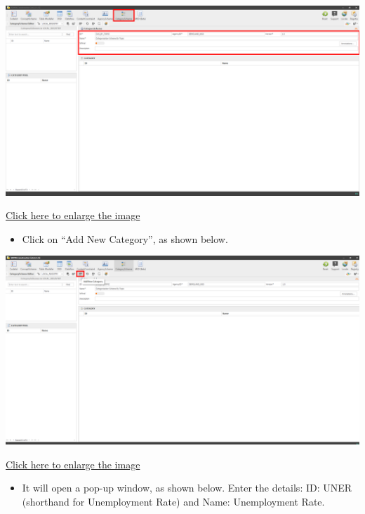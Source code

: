 \documentclass[
]{book}
\providecommand{\tightlist}{%
  \setlength{\itemsep}{0pt}\setlength{\parskip}{0pt}}
\begin{document}
\begin{center}\includegraphics[width=1\linewidth]{./images/image160} \end{center}

\href{images/image160.png}{Click here to enlarge the image}

\begin{itemize}
\tightlist
\item
  Click on ``Add New Category'', as shown below.
\end{itemize}

\begin{center}\includegraphics[width=1\linewidth]{./images/image162} \end{center}

\href{images/image162.png}{Click here to enlarge the image}

\begin{itemize}
\tightlist
\item
  It will open a pop-up window, as shown below. Enter the details: ID: UNER (shorthand for Unemployment Rate) and Name: Unemployment Rate.
\end{itemize}
\end{document}
